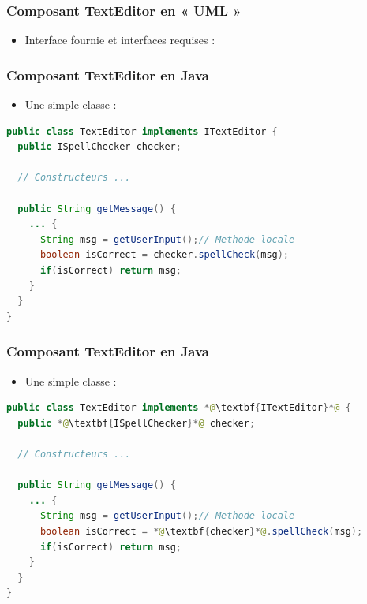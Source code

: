 \documentclass{beamer}
\begin{document}
\begin{frame}
  \frametitle{Composant TextEditor en « UML »}
  \begin{itemize}
  \item Interface fournie et interfaces requises :
    \vspace{5cm}
  \end{itemize}
\end{frame}

\begin{frame}[fragile]
  \frametitle{Composant TextEditor en Java}
  \begin{itemize}
  \item Une simple classe :
  \end{itemize}
\begin{lstlisting}[language=Java]
public class TextEditor implements ITextEditor {
  public ISpellChecker checker;

  // Constructeurs ...
  
  public String getMessage() {
    ... {
      String msg = getUserInput();// Methode locale
      boolean isCorrect = checker.spellCheck(msg);
      if(isCorrect) return msg;
    }
  }
}
\end{lstlisting}
\end{frame}

\begin{frame}[fragile]
  \frametitle{Composant TextEditor en Java}
  \begin{itemize}
  \item Une simple classe :
  \end{itemize}
\begin{lstlisting}[language=Java]
public class TextEditor implements *@\textbf{ITextEditor}*@ {
  public *@\textbf{ISpellChecker}*@ checker;

  // Constructeurs ...
  
  public String getMessage() {
    ... {
      String msg = getUserInput();// Methode locale
      boolean isCorrect = *@\textbf{checker}*@.spellCheck(msg);
      if(isCorrect) return msg;
    }
  }
}
\end{lstlisting}
\end{frame}
\end{document}
